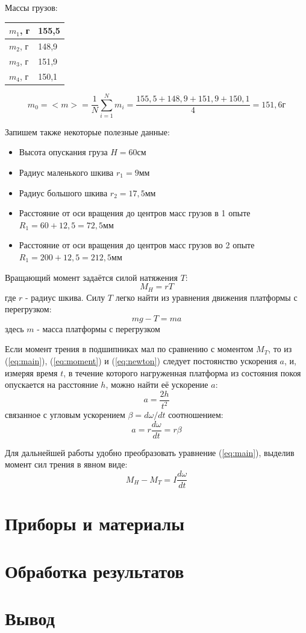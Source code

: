 \documentclass[a4paper, 12pt]{article}
\begin{document}
Массы грузов:
\begin{center}
\begin{tabular}{|l|l|}
\hline
$m_1$, г & 155,5 \\ \hline
$m_2$, г & 148,9 \\ \hline
$m_3$, г & 151,9 \\ \hline
$m_4$, г & 150,1 \\ \hline
\end{tabular}
\end{center}

\[
m_0 = <m> = \frac{1}{N}\sum_{i=1}^N m_i = \frac{155,5+148,9+151,9+150,1}{4} = 151,6\text{г} 
\]

Запишем также некоторые полезные данные:
\begin{itemize}
	\item Высота опускания груза $H = 60$см
	\item Радиус маленького шкива $r_1 = 9$мм
	\item Радиус большого шкива $r_2 = 17,5$мм
	\item Расстояние от оси вращения до центров масс грузов в 1 опыте $R_1 = 60 + 12,5 = 72,5$мм
	\item Расстояние от оси вращения до центров масс грузов во 2 опыте $R_1 = 200 + 12,5 = 212,5$мм
\end{itemize}

Вращающий момент задаётся силой натяжения $T$:
\begin{equation} \label{eq:moment}
M_H = rT
\end{equation}
где $r$ - радиус шкива. Силу $T$ легко найти из уравнения движения платформы с перегрузком:
\begin{equation} \label{eq:newton}
mg - T = ma
\end{equation}
здесь $m$ - масса платформы с перегрузком

Если момент трения в подшипниках мал по сравнению с моментом $M_T$, то из (\ref{eq:main}), (\ref{eq:moment}) и (\ref{eq:newton}) следует постоянство ускорения $a$, и, измеряя время $t$, в течение которого нагруженная платформа из состояния покоя опускается на расстояние $h$,
можно найти её ускорение $a$:
\[
a = \frac{2h}{t^2}
\]
связанное с угловым ускорением $\beta = d\omega /dt$ соотношением:
\begin{equation} \label{eq:acel}
a = r\frac{d\omega}{dt} = r\beta
\end{equation}

Для дальнейшей работы удобно преобразовать уравнение (\ref{eq:main}), выделив момент сил трения в явном виде:
\[
M_H - M_T = I\frac{d\omega}{dt}
\]



\section{Приборы и материалы}

\section{Обработка результатов}

\section{Вывод}
\end{document}
